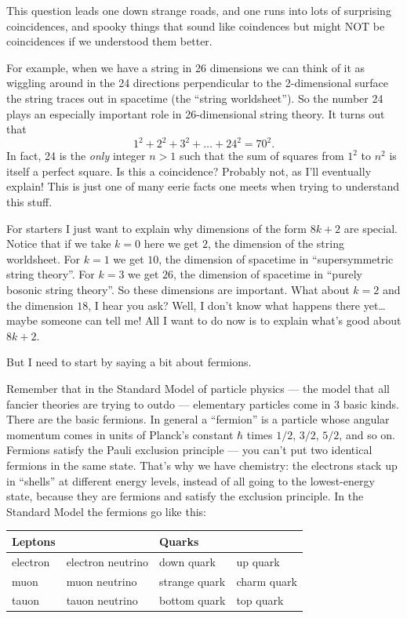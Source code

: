 \documentclass{article}
\begin{document}
This question leads one down strange roads, and one runs into lots of
surprising coincidences, and spooky things that sound like coindences
but might NOT be coincidences if we understood them better.

For example, when we have a string in 26 dimensions we can think of it
as wiggling around in the 24 directions perpendicular to the
2-dimensional surface the string traces out in spacetime (the ``string
worldsheet''). So the number 24 plays an especially important role in
26-dimensional string theory. It turns out that
\[1^2 + 2^2 + 3^2 + \ldots + 24^2 = 70^2.\] In fact, 24 is the
\emph{only} integer \(n > 1\) such that the sum of squares from \(1^2\)
to \(n^2\) is itself a perfect square. Is this a coincidence? Probably
not, as I'll eventually explain! This is just one of many eerie facts
one meets when trying to understand this stuff.

For starters I just want to explain why dimensions of the form
\(8k + 2\) are special. Notice that if we take \(k = 0\) here we get
\(2\), the dimension of the string worldsheet. For \(k = 1\) we get
\(10\), the dimension of spacetime in ``supersymmetric string theory''.
For \(k = 3\) we get \(26\), the dimension of spacetime in ``purely
bosonic string theory''. So these dimensions are important. What about
\(k = 2\) and the dimension \(18\), I hear you ask? Well, I don't know
what happens there yet\ldots{} maybe someone can tell me! All I want to
do now is to explain what's good about \(8k+2\).

But I need to start by saying a bit about fermions.

Remember that in the Standard Model of particle physics --- the model
that all fancier theories are trying to outdo --- elementary particles
come in 3 basic kinds. There are the basic fermions. In general a
``fermion'' is a particle whose angular momentum comes in units of
Planck's constant \(\hbar\) times \(1/2\), \(3/2\), \(5/2\), and so on.
Fermions satisfy the Pauli exclusion principle --- you can't put two
identical fermions in the same state. That's why we have chemistry: the
electrons stack up in ``shells'' at different energy levels, instead of
all going to the lowest-energy state, because they are fermions and
satisfy the exclusion principle. In the Standard Model the fermions go
like this:

\begin{longtable}[]{@{}llll@{}}
\toprule
\textbf{Leptons} & & \textbf{Quarks} &\tabularnewline
\midrule
\endhead
electron & electron neutrino & down quark & up quark\tabularnewline
muon & muon neutrino & strange quark & charm quark\tabularnewline
tauon & tauon neutrino & bottom quark & top quark\tabularnewline
\bottomrule
\end{longtable}
\end{document}
